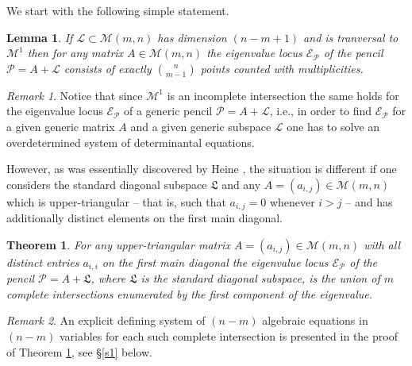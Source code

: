\documentclass[10pt,twoside,a4paper,reqno]{amsart}
\theoremstyle{plain}
\newtheorem{theo+}           {Theorem}
\newtheorem{lemm+}           {Lemma}
\theoremstyle{definition}
\theoremstyle{remark}
\newtheorem{rema+}           {Remark}
\newenvironment{theorem}{\begin{theo+}}{\end{theo+}}
\newenvironment{lemma}{\begin{lemm+}}{\end{lemm+}}
\newenvironment{remark}{\begin{rema+}}{\end{rema+}}
\begin{document}
We start with the  following simple statement.

\begin{lemma}\label{lm:int}
If ${\mathcal L}\subset {\mathcal {M}}(m,n)$ has dimension $(n-m+1)$ and is tranversal to ${\mathcal {M}}^1$ then for any matrix $A\in {\mathcal {M}}(m,n)$ the eigenvalue locus ${\mathcal E}_{\mathcal P}$ of the pencil ${\mathcal P}=A+{\mathcal L}$ consists of exactly $\binom {n}{m-1}$ points counted with multiplicities.
\end{lemma}

\begin{remark}
Notice that since ${\mathcal {M}}^1$ is an incomplete intersection the same holds for the eigenvalue
locus  ${\mathcal E}_{\mathcal P}$ of a generic pencil ${\mathcal P}=A+{\mathcal L}$, i.e., in order to find ${\mathcal E}_{\mathcal P}$ for a given generic matrix $A$ and a given generic subspace ${\mathcal L}$ one has to solve an overdetermined system of  determinantal  equations.  
\end{remark}

However, as was  essentially discovered  by Heine \cite{He}, the situation is different if one considers the standard diagonal subspace ${\mathfrak L}$ and any $A=(a_{i,j})\in {\mathcal {M}}(m,n)$ which is upper-triangular -- that is, such that $a_{i,j}=0$ whenever $i>j$ -- and has additionally distinct elements on the first main diagonal.

\begin{theorem}\label{th:Heine} For any upper-triangular matrix $A=(a_{i,j})\in {\mathcal {M}}(m,n)$ with all distinct  entries $a_{i,i}$ on the first main diagonal the
eigenvalue locus ${\mathcal E}_{\mathcal P}$ of the pencil ${\mathcal P}=A+{\mathfrak L}$, where ${\mathfrak L}$ is the standard diagonal subspace, is the union of $m$ complete intersections enumerated by the first component of the eigenvalue.
\end{theorem}

\begin{remark}
An explicit defining  system of $(n-m)$ algebraic equations in $(n-m)$ variables for each such complete intersection is presented in the proof of Theorem \ref{th:Heine}, see \S \ref{s1} below.
\end{remark}
\end{document}
